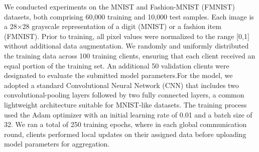 \documentclass[a4paper]{cas-dc}
\begin{document}
We conducted experiments on the MNIST and Fashion-MNIST (FMNIST) datasets, both comprising 60,000 training and 10,000 test samples. Each image is a 28×28 grayscale representation of a digit (MNIST) or a fashion item (FMNIST). Prior to training, all pixel values were normalized to the range [0,1] without additional data augmentation. We randomly and uniformly distributed the training data across 100 training clients, ensuring that each client received an equal portion of the training set. An additional 50 validation clients were designated to evaluate the submitted model parameters.For the model, we adopted a standard Convolutional Neural Network (CNN) that includes two convolutional-pooling layers followed by two fully connected layers, a common lightweight architecture suitable for MNIST-like datasets. The training process used the Adam optimizer with an initial learning rate of 0.01 and a batch size of 32. We ran a total of 250 training epochs, where in each global communication round, clients performed local updates on their assigned data before uploading model parameters for aggregation. 
\end{document}
